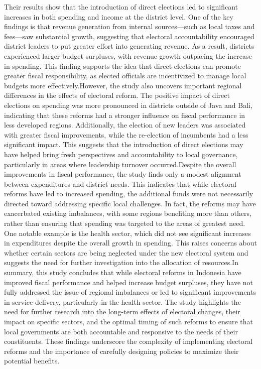 Their results show that the introduction of direct elections led to significant increases in both spending and income at the district level. One of the key findings is that revenue generation from internal sources—such as local taxes and fees—saw substantial growth, suggesting that electoral accountability encouraged district leaders to put greater effort into generating revenue. As a result, districts experienced larger budget surpluses, with revenue growth outpacing the increase in spending. This finding supports the idea that direct elections can promote greater fiscal responsibility, as elected officials are incentivized to manage local budgets more effectively.However, the study also uncovers important regional differences in the effects of electoral reform. The positive impact of direct elections on spending was more pronounced in districts outside of Java and Bali, indicating that these reforms had a stronger influence on fiscal performance in less developed regions. Additionally, the election of new leaders was associated with greater fiscal improvements, while the re-election of incumbents had a less significant impact. This suggests that the introduction of direct elections may have helped bring fresh perspectives and accountability to local governance, particularly in areas where leadership turnover occurred.Despite the overall improvements in fiscal performance, the study finds only a modest alignment between expenditures and district needs. This indicates that while electoral reforms have led to increased spending, the additional funds were not necessarily directed toward addressing specific local challenges. In fact, the reforms may have exacerbated existing imbalances, with some regions benefiting more than others, rather than ensuring that spending was targeted to the areas of greatest need. One notable example is the health sector, which did not see significant increases in expenditures despite the overall growth in spending. This raises concerns about whether certain sectors are being neglected under the new electoral system and suggests the need for further investigation into the allocation of resources.In summary, this study concludes that while electoral reforms in Indonesia have improved fiscal performance and helped increase budget surpluses, they have not fully addressed the issue of regional imbalances or led to significant improvements in service delivery, particularly in the health sector. The study highlights the need for further research into the long-term effects of electoral changes, their impact on specific sectors, and the optimal timing of such reforms to ensure that local governments are both accountable and responsive to the needs of their constituents. These findings underscore the complexity of implementing electoral reforms and the importance of carefully designing policies to maximize their potential benefits. \par
